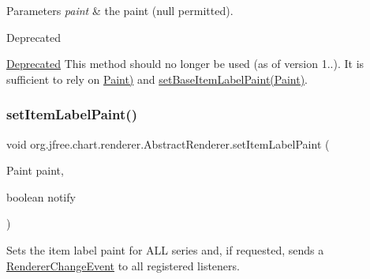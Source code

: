 \begin{DoxyParams}{Parameters}
{\em paint} & the paint ({\ttfamily null} permitted).\\
\hline
\end{DoxyParams}
\begin{DoxyRefDesc}{Deprecated}
\item[\mbox{\hyperlink{deprecated__deprecated000135}{Deprecated}}]This method should no longer be used (as of version 1..). It is sufficient to rely on \mbox{\hyperlink{}{Paint)}} and \mbox{\hyperlink{classorg_1_1jfree_1_1chart_1_1renderer_1_1_abstract_renderer_a7f9efd901126d27a6f785a53e6872e04}{set\+Base\+Item\+Label\+Paint(\+Paint)}}. \end{DoxyRefDesc}
\mbox{\label{classorg_1_1jfree_1_1chart_1_1renderer_1_1_abstract_renderer_aa6fcfaba6ff79ab8e49ed761b1bd059d}} 
\subsubsection{\texorpdfstring{set\+Item\+Label\+Paint()}{setItemLabelPaint()}\hspace{0.1cm}{\footnotesize\ttfamily [2/2]}}
{\footnotesize\ttfamily void org.\+jfree.\+chart.\+renderer.\+Abstract\+Renderer.\+set\+Item\+Label\+Paint (\begin{DoxyParamCaption}\item[{Paint}]{paint,  }\item[{boolean}]{notify }\end{DoxyParamCaption})}

Sets the item label paint for A\+LL series and, if requested, sends a \mbox{\hyperlink{}{Renderer\+Change\+Event}} to all registered listeners.


